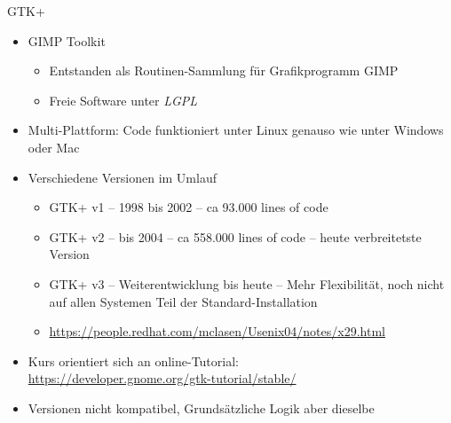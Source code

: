 
\begin{frame}[t,plain]
\titlepage
\end{frame}


\begin{frame}{GTK+}
%
\begin{itemize}
\item GIMP Toolkit
	\begin{itemize}
	\item Entstanden als Routinen-Sammlung für Grafikprogramm GIMP
	\item Freie Software unter \emph{LGPL}
	\end{itemize}
\item Multi-Plattform: Code funktioniert unter Linux genauso wie unter Windows oder Mac
\item Verschiedene Versionen im Umlauf
	\begin{itemize}
	\item GTK+ v1 -- 1998 bis 2002 -- ca  93.000 lines of code
	\item GTK+ v2 -- bis 2004 -- ca 558.000 lines of code -- heute verbreitetste Version
	\item GTK+ v3 -- Weiterentwicklung bis heute -- 
		Mehr Flexibilität, noch nicht auf allen Systemen Teil der Standard-Installation
	\item \url{https://people.redhat.com/mclasen/Usenix04/notes/x29.html}
	\end{itemize}
\item Kurs orientiert sich an online-Tutorial:\\
	\url{https://developer.gnome.org/gtk-tutorial/stable/}
\item Versionen nicht kompatibel, Grundsätzliche Logik aber dieselbe
\end{itemize}

%
\end{frame}


